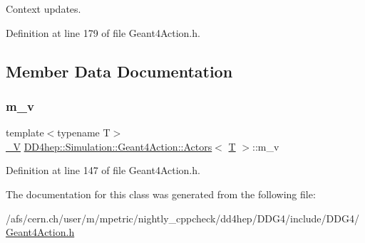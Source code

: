 Context updates. 



Definition at line 179 of file Geant4\+Action.\+h.



\subsection{Member Data Documentation}
\hypertarget{class_d_d4hep_1_1_simulation_1_1_geant4_action_1_1_actors_a9b46bb7156ab383291efa066fc23ce7d}{}\label{class_d_d4hep_1_1_simulation_1_1_geant4_action_1_1_actors_a9b46bb7156ab383291efa066fc23ce7d} 
\subsubsection{\texorpdfstring{m\+\_\+v}{m\_v}}
{\footnotesize\ttfamily template$<$typename T$>$ \\
\hyperlink{class_d_d4hep_1_1_simulation_1_1_geant4_action_1_1_actors_a18b6dfb1542a2cd036d8317db48f6c16}{\+\_\+V} \hyperlink{class_d_d4hep_1_1_simulation_1_1_geant4_action_1_1_actors}{D\+D4hep\+::\+Simulation\+::\+Geant4\+Action\+::\+Actors}$<$ \hyperlink{class_t}{T} $>$\+::m\+\_\+v}



Definition at line 147 of file Geant4\+Action.\+h.



The documentation for this class was generated from the following file\+:\begin{DoxyCompactItemize}
\item 
/afs/cern.\+ch/user/m/mpetric/nightly\+\_\+cppcheck/dd4hep/\+D\+D\+G4/include/\+D\+D\+G4/\hyperlink{_geant4_action_8h}{Geant4\+Action.\+h}\end{DoxyCompactItemize}
